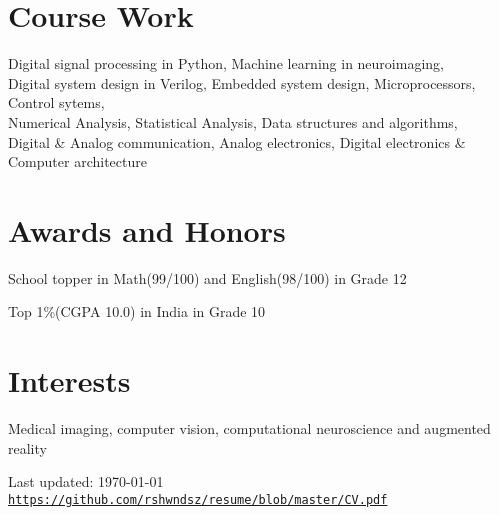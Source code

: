 \documentclass[letterpaper]{article}
\def\footerlink{https://github.com/rshwndsz/resume/blob/master/CV.pdf}
\renewenvironment{itemize}{
  \begin{list}{}{
    \setlength{\leftmargin}{1.5em}
  }
}{
  \end{list}
}
\begin{document}
\section*{Course Work}
  \begin{itemize}
    \item  Digital signal processing in Python, Machine learning in neuroimaging, \\
    Digital system design in Verilog, Embedded system design,
    Microprocessors, Control sytems,\\
    Numerical Analysis, Statistical Analysis, Data structures and algorithms, \\
    Digital \& Analog communication, Analog electronics, Digital electronics \& Computer architecture
  \end{itemize}


\section*{Awards and Honors}
\begin{itemize}
  \item School topper in Math(99/100) and English(98/100) in Grade 12
  \item Top 1\%(CGPA 10.0) in India in Grade 10
\end{itemize}


\section*{Interests}
  \begin{itemize}
    \item Medical imaging, computer vision, computational neuroscience and augmented reality
  \end{itemize}


\bigskip
\begin{center}
  \begin{footnotesize}
    Last updated: \today \\
    \href{\footerlink}{\texttt{\footerlink}}
  \end{footnotesize}
\end{center}
\end{document}
